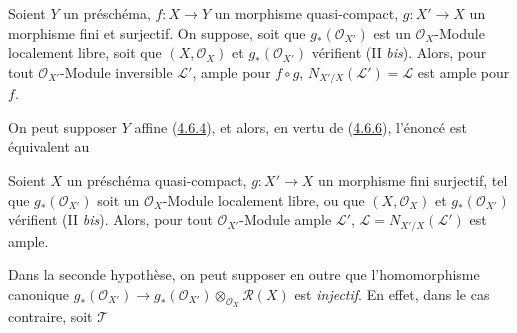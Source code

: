\begin{proposition}[6.6.1]
\label{II.6.6.1-fr}
Soient $Y$ un préschéma, $f:X\to Y$ un morphisme quasi-compact,
$g:X'\to X$ un morphisme fini et surjectif. On suppose, soit que
$g_*(\mathcal{O}_{X'})$ est un $\mathcal{O}_X$-Module localement libre, soit
que $(X,\mathcal{O}_X)$ et $g_*(\mathcal{O}_{X'})$ vérifient (II
\emph{bis}). Alors, pour tout $\mathcal{O}_{X'}$-Module inversible
$\mathcal{L}'$, ample pour $f\circ g$, $N_{X'/X}(\mathcal{L}')=\mathcal{L}$
est ample pour $f$.
\end{proposition}

On peut supposer $Y$ affine (\hyperref[II.4.6.4-fr]{4.6.4}), et alors, en
vertu de (\hyperref[II.4.6.6-fr]{4.6.6}), l'énoncé est équivalent au

\begin{corollary}[6.6.2]
\label{II.6.6.2-fr}
Soient $X$ un préschéma quasi-compact, $g:X'\to X$ un morphisme fini
surjectif, tel que $g_*(\mathcal{O}_{X'})$ soit un $\mathcal{O}_X$-Module
localement libre, ou que $(X,\mathcal{O}_X)$ et $g_*(\mathcal{O}_{X'})$
vérifient (II \emph{bis}). Alors, pour tout $\mathcal{O}_{X'}$-Module ample
$\mathcal{L}'$, $\mathcal{L}=N_{X'/X}(\mathcal{L}')$ est ample.
\end{corollary}

Dans la seconde hypothèse, on peut supposer en outre que l'homomorphisme
canonique
$g_*(\mathcal{O}_{X'})\to
g_*(\mathcal{O}_{X'})\otimes_{\mathcal{O}_X}\mathcal{R}(X)$ est
\emph{injectif}. En effet, dans le cas contraire, soit $\mathcal{T}$

